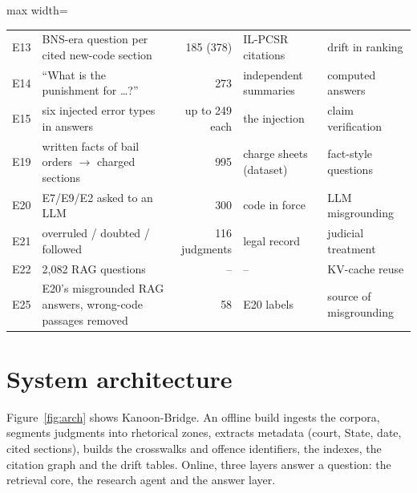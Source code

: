 \documentclass[sigconf,nonacm]{acmart}
\begin{document}
\begin{table}[t]
\begin{adjustbox}{max width=\linewidth}
\begin{tabular}{llrll}
E13 & BNS-era question per cited new-code section & 185 (378) & IL-PCSR citations & drift in ranking \\
E14 & ``What is the punishment for \ldots?'' & 273 & independent summaries & computed answers \\
E15 & six injected error types in answers & up to 249 each & the injection & claim verification \\
E19 & written facts of bail orders $\to$ charged sections & 995 & charge sheets (dataset) & fact-style questions \\
E20 & E7/E9/E2 asked to an LLM & 300 & code in force & LLM misgrounding \\
E21 & overruled / doubted / followed & 116 judgments & legal record & judicial treatment \\
E22 & 2,082 RAG questions & -- & -- & KV-cache reuse \\
E25 & E20's misgrounded RAG answers, wrong-code passages removed & 58 & E20 labels & source of misgrounding \\
\bottomrule
\end{tabular}
\end{adjustbox}
\end{table}

\section{System architecture}\label{sec:system}

Figure~\ref{fig:arch} shows Kanoon-Bridge. An offline build ingests the corpora, segments judgments
into rhetorical zones, extracts metadata (court, State, date, cited sections), builds the
crosswalks and offence identifiers, the indexes, the citation graph and the drift tables. Online,
three layers answer a question: the retrieval core, the research agent and the answer layer.
\end{document}
